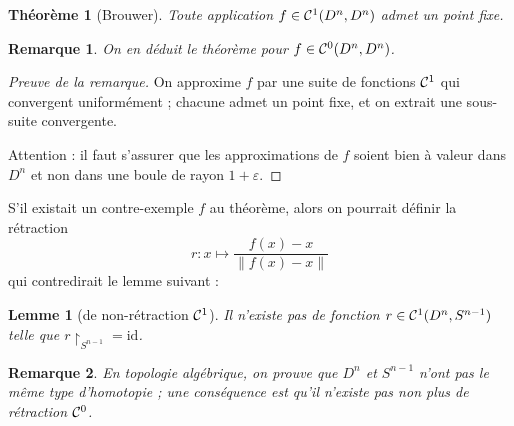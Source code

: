 \documentclass[a4paper, 11pt]{article}
\def\Cf{{\cal{C}}}
\newtheorem*{theorem}{Théorème}
\newtheorem*{lemma}{Lemme}
\newtheorem*{remark}{Remarque}
\begin{document}
\begin{theorem}[Brouwer]
  Toute application $f \in \Cf^1(D^n, D^n)$ admet un point fixe.
\end{theorem}

\begin{remark}
  On en déduit le théorème pour $f \in \Cf^0(D^n, D^n)$.
\end{remark}
\begin{proof}[Preuve de la remarque]
  On approxime $f$ par une suite de fonctions $\Cf^1$ qui convergent
  uniformément ; chacune admet un point fixe, et on extrait une sous-suite
  convergente.

  Attention : il faut s'assurer que les approximations de $f$ soient bien à
  valeur dans $D^n$ et non dans une boule de rayon $1+\varepsilon$.
\end{proof}

S'il existait un contre-exemple $f$ au théorème, alors on pourrait définir la
rétraction
\[ r : x \mapsto \frac{f(x) - x}{\|f(x) - x\|}\]
qui contredirait le lemme suivant :

\begin{lemma}[de non-rétraction $\Cf^1$]
  Il n'existe pas de fonction $r \in \Cf^1(D^n, S^{n-1})$ telle que
  $r\restriction_{S^{n-1}} = \mathrm{id}$.
\end{lemma}
\begin{remark}
En topologie algébrique, on prouve que $D^n$ et $S^{n-1}$ n'ont pas le même type
d'homotopie ; une conséquence est qu'il n'existe pas non plus de rétraction
$\Cf^0$.
\end{remark}
\end{document}
